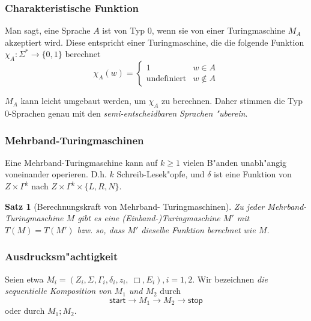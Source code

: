 \documentclass[german, 10pt, a4paper, twocolumn]{scrartcl}
\newtheorem{satz}{Satz}[section]
\theoremstyle{definition}
\theoremstyle{example}
\begin{document}
\subsubsection{Charakteristische Funktion}

Man sagt, eine Sprache $A$ ist von Typ 0, wenn sie von einer Turingmaschine $M_A$ akzeptiert wird. Diese entspricht einer Turingmaschine, die die folgende Funktion $\chi_A : \Sigma^* \to \{ 0,1 \}$ berechnet
\begin{displaymath}
	\chi_A(w) = \left \{
	\begin{array}{ll}
		1 &			w \in A\\
		\text{undefiniert} &	w \not \in A
	\end{array}
	\right .
\end{displaymath}

$M_A$ kann leicht umgebaut werden, um $\chi_A$ zu berechnen. Daher stimmen die Typ 0-Sprachen genau mit den \textit{semi-entscheidbaren Sprachen "uberein}.

\subsubsection{Mehrband-Turingmaschinen}

Eine Mehrband-Turingmaschine kann auf $k\geq 1$ vielen B"anden unabh"angig voneinander operieren. D.h. $k$ Schreib-Lesek"opfe, und $\delta$ ist eine Funktion von $Z \times \Gamma^k$ nach $Z \times \Gamma^k \times \{ L,R,N \}$.

\begin{satz}[Berechnungskraft von Mehrband- Turingmaschinen]
	Zu jeder Mehrband- Turingmaschine $M$ gibt es eine (Einband-)Turingmaschine $M'$ mit $T(M) = T(M')$ bzw. so, dass $M'$ dieselbe Funktion berechnet wie $M$.
\end{satz}

\subsubsection{Ausdrucksm"achtigkeit}

Seien etwa $M_i = (Z_i, \Sigma, \Gamma_i, \delta_i, z_i, \ \Box, E_i), i=1,2$. Wir bezeichnen \textit{die sequentielle Komposition von $M_1$ und $M_2$} durch
\begin{displaymath}
	\textsf{start} \longrightarrow M_1 \longrightarrow M_2 \longrightarrow \textsf{stop}
\end{displaymath}
oder durch $M_1; M_2$.\\
\end{document}
